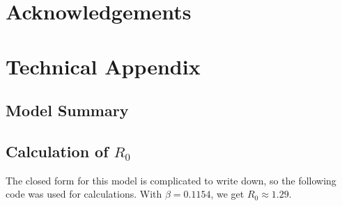 \documentclass[11pt]{article}
\begin{document}
\section{Acknowledgements}




\section{Technical Appendix}

\subsection{Model Summary}


\subsection{Calculation of $R_0$}
The closed form for this model is complicated to write down, so the following
code was used for calculations. With $\beta=0.1154$, we get $R_0\approx1.29$.


\end{document}
